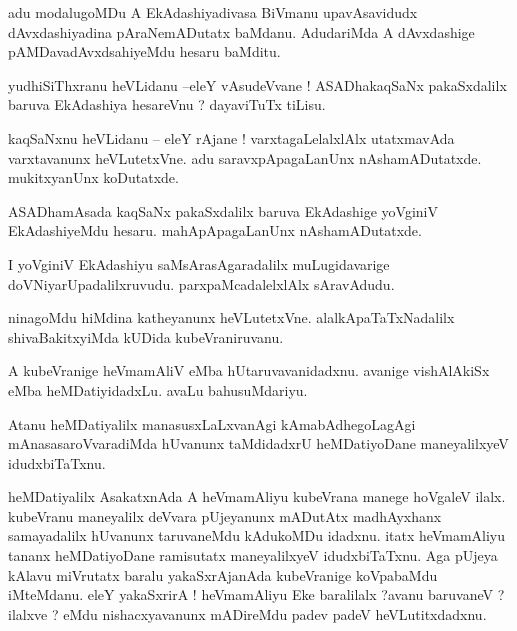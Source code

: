 \documentclass{article}
\begin{document}
\begin{mn}%
adu modalugoMDu A EkAdashiyadivasa BiVmanu upavAsavidudx dAvxdashiyadina pAraNemADutatx baMdanu. 
AdudariMda A dAvxdashige pAMDavadAvxdsahiyeMdu hesaru baMditu.
\end{mn}


\begin{mn}%
yudhiSiThxranu heVLidanu --eleY vAsudeVvane ! ASADhakaqSaNx pakaSxdalilx baruva EkAdashiya 
hesareVnu ? dayaviTuTx tiLisu.
\end{mn}

\begin{mn}%
kaqSaNxnu heVLidanu -- eleY rAjane ! varxtagaLelalxlAlx utatxmavAda varxtavanunx heVLutetxVne. adu 
saravxpApagaLanUnx nAshamADutatxde. mukitxyanUnx koDutatxde.
\end{mn}

\begin{mn}%
ASADhamAsada kaqSaNx pakaSxdalilx baruva EkAdashige yoVginiV EkAdashiyeMdu hesaru. mahApApagaLanUnx 
nAshamADutatxde.
\end{mn}

\begin{mn}%
I yoVginiV EkAdashiyu saMsArasAgaradalilx muLugidavarige doVNiyarUpadalilxruvudu. 
parxpaMcadalelxlAlx sAravAdudu.
\end{mn}

\begin{mn}%
ninagoMdu hiMdina katheyanunx heVLutetxVne. alalkApaTaTxNadalilx shivaBakitxyiMda kUDida 
kubeVraniruvanu.
\end{mn}

\begin{mn}%
A kubeVranige heVmamAliV eMba hUtaruvavanidadxnu. avanige vishAlAkiSx eMba heMDatiyidadxLu. avaLu 
bahusuMdariyu.
\end{mn}

\begin{mn}%
Atanu heMDatiyalilx manasusxLaLxvanAgi kAmabAdhegoLagAgi mAnasasaroVvaradiMda hUvanunx taMdidadxrU 
heMDatiyoDane maneyalilxyeV idudxbiTaTxnu.
\end{mn}

\begin{mn}%
heMDatiyalilx AsakatxnAda A heVmamAliyu kubeVrana manege hoVgaleV ilalx. kubeVranu maneyalilx 
deVvara pUjeyanunx mADutAtx madhAyxhanx samayadalilx hUvanunx taruvaneMdu kAdukoMDu idadxnu. itatx 
heVmamAliyu tananx heMDatiyoDane ramisutatx maneyalilxyeV idudxbiTaTxnu. Aga pUjeya kAlavu 
miVrutatx baralu yakaSxrAjanAda kubeVranige koVpabaMdu iMteMdanu. eleY yakaSxrirA ! heVmamAliyu 
Eke baralilalx ?avanu baruvaneV ? ilalxve ? eMdu nishacxyavanunx mADireMdu padev padeV 
heVLutitxdadxnu.
\end{mn}
\end{document}
